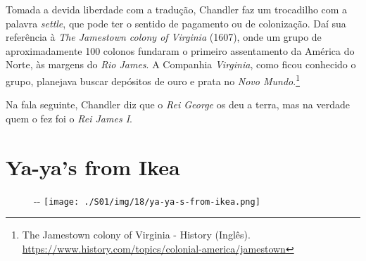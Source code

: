 Tomada a devida liberdade com a tradução, Chandler faz um trocadilho com
a palavra \emph{settle}, que pode ter o sentido de pagamento ou de
colonização. Daí sua referência à \emph{The Jamestown colony of
Virginia} (1607), onde um grupo de aproximadamente 100 colonos fundaram
o primeiro assentamento da América do Norte, às margens do \emph{Rio
James}. A Companhia \emph{Virginia}, como ficou conhecido o grupo,
planejava buscar depósitos de ouro e prata no \emph{Novo
Mundo}.\footnote{\sloppy The Jamestown colony of Virginia - History (Inglês). \url{https://www.history.com/topics/colonial-america/jamestown}}

Na fala seguinte, Chandler diz que o \emph{Rei George} os deu a terra,
mas na verdade quem o fez foi o \emph{Rei James I}.

\hypertarget{ya-yas-from-ikea}{%
\section{Ya-ya's from Ikea}\label{ya-yas-from-ikea}}

\begin{figure}[!ht]
  \begin{adjustwidth}{-\oddsidemargin-1in}{-\rightmargin}
    \centering
    \texttt{[image: ./S01/img/18/ya-ya-s-from-ikea.png]}
  \end{adjustwidth}
\end{figure}

